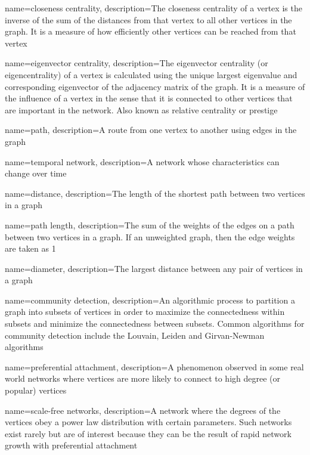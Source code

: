 {
    name={closeness centrality},
    description={The closeness centrality of a vertex is the inverse of the sum of the distances from that vertex to all other vertices in the graph. It is a measure of how efficiently other vertices can be reached from that vertex}
}

{
    name={eigenvector centrality},
    description={The eigenvector centrality (or eigencentrality) of a vertex is calculated using the unique largest eigenvalue  and corresponding eigenvector of the adjacency matrix of the graph. It is a measure of the influence of a vertex in the sense that it is connected to other vertices that are important in the network.  Also known as relative centrality or prestige}
}


{
    name={path},
    description={A route from one vertex to another using edges in the graph}
}

{
    name={temporal network},
    description={A network whose characteristics can change over time}
}

{
    name={distance},
    description={The length of the shortest path between two vertices in a graph}
}

{
    name={path length},
    description={The sum of the weights of the edges on a path between two vertices in a graph.  If an unweighted graph, then the edge weights are taken as 1}
}

{
    name={diameter},
    description={The largest distance between any pair of vertices in a graph}
}

{
    name={community detection},
    description={An algorithmic process to partition a graph into subsets of vertices in order to maximize the connectedness within subsets and minimize the connectedness between subsets.  Common algorithms for community detection include the Louvain, Leiden and Girvan-Newman algorithms}
}

{
    name={preferential attachment},
    description={A phenomenon observed in some real world networks where vertices are more likely to connect to high degree (or popular) vertices}
}

{
    name={scale-free networks},
    description={A network where the degrees of the vertices obey a power law distribution with certain parameters. Such networks exist rarely but are of interest because they can be the result of rapid network growth with preferential attachment}
}

